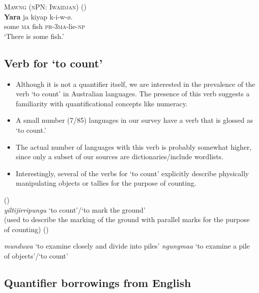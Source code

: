 \documentclass{article}
\makeatletter
\newcommand{\ofy}{/85} %
\makeatother
\begin{document}
\begin{exe}
  \ex\label{ex:dyara} \textsc{Mawng (nPN: Iwaidjan)} (\citealt{ngaralk})\\
  \gll \textbf{Yara} ja kiyap k-i-w-ø.\\
  some \textsc{ma} fish \textsc{pr-3ma}-lie-\textsc{np}\\
  \glt `There is some fish.' %
\end{exe}

\subsection{Verb for `to count'}

\begin{itemize}
\item Although it is not a quantifier itself, we are interested in the prevalence of the verb `to count' in Australian languages. The presence of this verb suggests a familiarity with quantificational concepts like numeracy.
\item A small number (7\ofy) languages in our survey have a verb that is glossed as `to count.'
\item The actual number of languages with this verb is probably somewhat higher, since only a subset of our sources are dictionaries/include wordlists.
\item Interestingly, several of the verbs for `to count' explicitly describe physically manipulating objects or tallies for the purpose of counting.
\end{itemize}

\begin{exe}
   (\citealt[179]{pintupi77})\\
  \textit{yiltijirripungu} `to count'/`to mark the ground'\\
  (used to describe the marking of the ground with parallel marks for the purpose of counting)
   (\citealt{heath84})
  \begin{xlist}
    \ex \textit{munduwa} `to examine closely and divide into piles' 
    \ex \textit{ngunymaa} `to examine a pile of objects'/`to count'
  \end{xlist}
\end{exe} 

\subsection{Quantifier borrowings from English}
\end{document}
